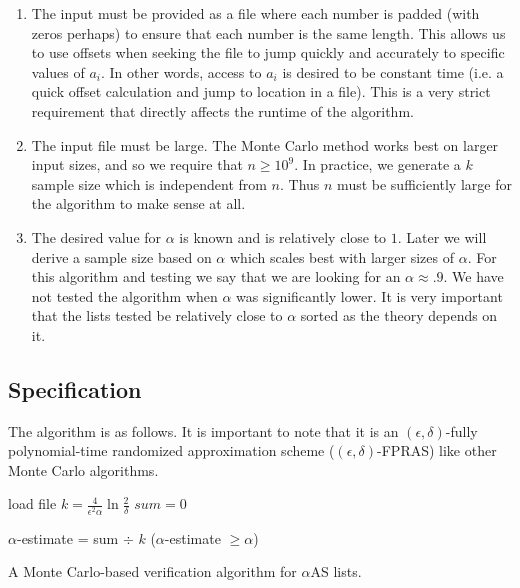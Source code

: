\documentclass[11pt]{article}
\begin{document}
\begin{enumerate}

\item The input must be provided as a file where each number is padded (with zeros perhaps) to ensure that each number is the same length. This allows us to use offsets when seeking the file to jump quickly and accurately to specific values of $a_i$. In other words, access to $a_i$ is desired to be constant time (i.e. a quick offset calculation and jump to location in a file). This is a very strict requirement that directly affects the runtime of the algorithm. 

\item The input file must be large. The Monte Carlo method works best on larger input sizes, and so we require that $n \geq 10^9$. In practice, we generate a $k$ sample size which is independent from $n$. Thus $n$ must be sufficiently large for the algorithm to make sense at all.

\item The desired value for $\alpha$ is known and is relatively close to $1$. Later we will derive a sample size based on $\alpha$ which scales best with larger sizes of $\alpha$. For this algorithm and testing we say that we are looking for an $\alpha \approx .9$. We have not tested the algorithm when $\alpha$ was significantly lower. It is very important that the lists tested be relatively close to $\alpha$ sorted as the theory depends on it. 

\end{enumerate}

\subsection{Specification}

The algorithm is as follows. It is important to note that it is an $(\epsilon, \delta)$-fully polynomial-time randomized approximation scheme ($(\epsilon, \delta)$-FPRAS) like other Monte Carlo algorithms. 

\vspace{.15in}

\begin{algorithm}[H]
 
 	load file\;
 	$k = \frac{4}{\epsilon^2 \alpha} \ln \frac{2}{\delta}$\;
	$sum = 0$\; 
 
 	
 	$\alpha$-estimate = sum $\div$ $k$\;
 	\Return ($\alpha$-estimate $\geq \alpha$)\;
 	\vspace{.15in}
 	\caption{A Monte Carlo-based verification algorithm for $\alpha$AS lists.}
\end{algorithm}
\end{document}
